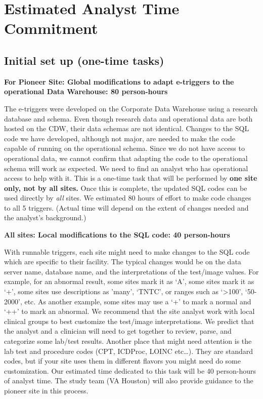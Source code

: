 \documentclass{article}
\begin{document}
\section{Estimated Analyst Time Commitment}

\subsection{Initial set up (one-time tasks)}

\textbf{For Pioneer Site: Global modifications to adapt e-triggers to
  the operational Data Warehouse: 80 person-hours}

The e-triggers were developed on the Corporate Data Warehouse using a
research database and schema. Even though research data and
operational data are both hosted on the CDW, their data schemas are
not identical. Changes to the SQL code we have developed, although not
major, are needed to make the code capable of running on the
operational schema. Since we do not have access to operational data,
we cannot confirm that adapting the code to the operational schema
will work as expected. We need to find an analyst who has operational
access to help with it. This is a one-time task that will be performed
by \textbf{one site only, not by all sites.} Once this is complete,
the updated SQL codes can be used directly by \emph{all} sites. We
estimated 80 hours of effort to make code changes to all 5 triggers.
(Actual time will depend on the extent of changes needed and the
analyst's background.)

\noindent\textbf{All sites: Local modifications to the SQL code: 40
  person-hours}

With runnable triggers, each site might need to make changes to the
SQL code which are specific to their facility. The typical changes
would be on the data server name, database name, and the
interpretations of the test/image values. For example, for an abnormal
result, some sites mark it as `A', some sites mark it as `+', some
sites use descriptions as 'many', `TNTC', or ranges such as
`\textgreater{}100', `50-2000', etc. As another example, some sites
may use a `+' to mark a normal and `++' to mark an abnormal. We
recommend that the site analyst work with local clinical groups to
best customize the test/image interpretations. We predict that the
analyst and a clinician will need to get together to review, parse,
and categorize some lab/test results. Another place that might need
attention is the lab test and procedure codes (CPT, ICDProc, LOINC
etc\ldots{}). They are standard codes, but if your site uses them in
different flavors you might need do some customization. Our estimated
time dedicated to this task will be 40 person-hours of analyst time.
The study team (VA Houston) will also provide guidance to the
pioneer site in this process.
\end{document}
